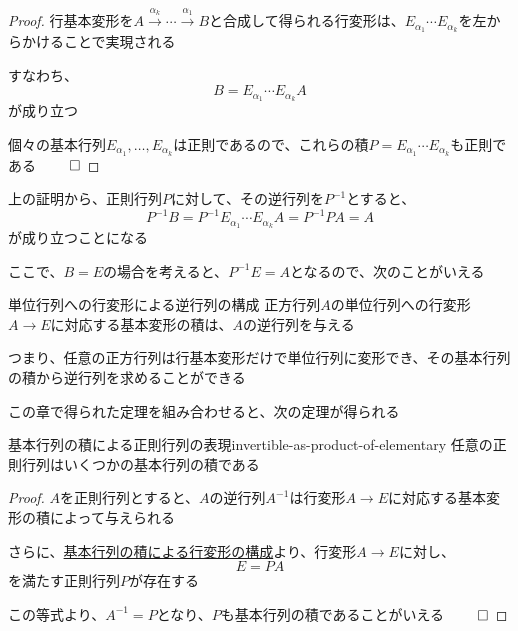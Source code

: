 \documentclass[../../../topic_linear-algebra]{subfiles}
\begin{document}
\begin{proof}
  行基本変形を$A \xrightarrow{\alpha_k} \cdots \xrightarrow{\alpha_1} B$と合成して得られる行変形は、$E_{\alpha_1} \cdots E_{\alpha_k}$を左からかけることで実現される

  すなわち、
  \begin{equation*}
    B = E_{\alpha_1} \cdots E_{\alpha_k} A
  \end{equation*}
  が成り立つ

  個々の基本行列$E_{\alpha_1},\ldots,E_{\alpha_k}$は正則であるので、これらの積$P = E_{\alpha_1} \cdots E_{\alpha_k}$も正則である $\qed$
\end{proof}

\br

上の証明から、正則行列$P$に対して、その逆行列を$P^{-1}$とすると、
\begin{equation*}
  P^{-1}B = P^{-1}E_{\alpha_1} \cdots E_{\alpha_k} A = P^{-1}PA = A
\end{equation*}
が成り立つことになる

\br

ここで、$B = E$の場合を考えると、$P^{-1}E = A$となるので、次のことがいえる

\begin{theorem*}{単位行列への行変形による逆行列の構成}
  正方行列$A$の単位行列への行変形$A \to E$に対応する基本変形の積は、$A$の逆行列を与える
\end{theorem*}

つまり、任意の正方行列は行基本変形だけで単位行列に変形でき、その基本行列の積から逆行列を求めることができる

\sectionline

この章で得られた定理を組み合わせると、次の定理が得られる

\begin{theorem}{基本行列の積による正則行列の表現}{invertible-as-product-of-elementary}
  任意の正則行列はいくつかの基本行列の積である
\end{theorem}

\begin{proof}
  $A$を正則行列とすると、$A$の逆行列$A^{-1}$は行変形$A \to E$に対応する基本変形の積によって与えられる

  さらに、\hyperref[thm:row-operation-by-elementary-matrices]{基本行列の積による行変形の構成}より、行変形$A \to E$に対し、
  \begin{equation*}
    E = PA
  \end{equation*}
  を満たす正則行列$P$が存在する

  この等式より、$A^{-1} = P$となり、$P$も基本行列の積であることがいえる $\qed$
\end{proof}
\end{document}

